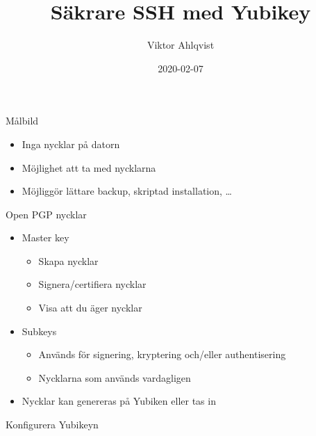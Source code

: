 \documentclass{beamer}
\title{Säkrare SSH med Yubikey}
\date{2020-02-07}
\author{Viktor Ahlqvist}
\institute{Omegapoint kompetensdag}
\begin{document}
\maketitle

\begin{frame}{Målbild}
  \begin{itemize}
    \item Inga nycklar på datorn
    \item Möjlighet att ta med nycklarna
    \item Möjliggör lättare backup, skriptad installation, …
  \end{itemize}
\end{frame}

\begin{frame}{Open PGP nycklar}
  \begin{itemize}
    \item Master key
      \begin{itemize}
        \item Skapa nycklar
        \item Signera/certifiera nycklar
        \item Visa att du äger nycklar
      \end{itemize}
    \item Subkeys
      \begin{itemize}
        \item Används för signering, kryptering och/eller authentisering
        \item Nycklarna som används vardagligen
      \end{itemize}
    \item Nycklar kan genereras på Yubiken eller tas in
  \end{itemize}
\end{frame}

\begin{frame}[fragile]{Konfigurera Yubikeyn}
\end{frame}
\end{document}
